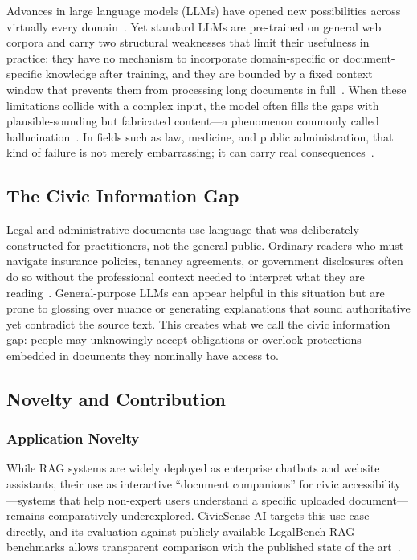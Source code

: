\documentclass[conference]{IEEEtran}
\begin{document}
Advances in large language models (LLMs) have opened new possibilities across virtually every domain~\cite{b1,b2}. Yet standard LLMs are pre-trained on general web corpora and carry two structural weaknesses that limit their usefulness in practice: they have no mechanism to incorporate domain-specific or document-specific knowledge after training, and they are bounded by a fixed context window that prevents them from processing long documents in full~\cite{b3,b4}. When these limitations collide with a complex input, the model often fills the gaps with plausible-sounding but fabricated content---a phenomenon commonly called hallucination~\cite{b5,b6}. In fields such as law, medicine, and public administration, that kind of failure is not merely embarrassing; it can carry real consequences~\cite{b3,b7}.

\subsection{The Civic Information Gap}

Legal and administrative documents use language that was deliberately constructed for practitioners, not the general public. Ordinary readers who must navigate insurance policies, tenancy agreements, or government disclosures often do so without the professional context needed to interpret what they are reading~\cite{b3,b10}. General-purpose LLMs can appear helpful in this situation but are prone to glossing over nuance or generating explanations that sound authoritative yet contradict the source text. This creates what we call the civic information gap: people may unknowingly accept obligations or overlook protections embedded in documents they nominally have access to.

\subsection{Novelty and Contribution}

\subsubsection{Application Novelty}
While RAG systems are widely deployed as enterprise chatbots and website assistants, their use as interactive ``document companions'' for civic accessibility---systems that help non-expert users understand a specific uploaded document---remains comparatively underexplored. CivicSense AI targets this use case directly, and its evaluation against publicly available LegalBench-RAG benchmarks allows transparent comparison with the published state of the art~\cite{b4,b20}.
\end{document}

